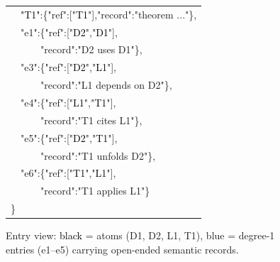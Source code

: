 \begin{figure}[ht]
\begin{minipage}[t]{0.48\textwidth}
{\begin{tabular}{@{}l@{}}
\ \ \textcolor{black}{"T1"}:\{"ref":["\textcolor{black}{T1}"],"record":"theorem ..."\},\\
\ \ \textcolor{blue!70!black}{"e1"}:\{"ref":["\textcolor{black}{D2}","\textcolor{black}{D1}"],\\
\ \ \ \ \ \ "record":"D2 uses D1"\},\\
\ \ \textcolor{blue!70!black}{"e3"}:\{"ref":["\textcolor{black}{D2}","\textcolor{black}{L1}"],\\
\ \ \ \ \ \ "record":"L1 depends on D2"\},\\
\ \ \textcolor{blue!70!black}{"e4"}:\{"ref":["\textcolor{black}{L1}","\textcolor{black}{T1}"],\\
\ \ \ \ \ \ "record":"T1 cites L1"\},\\
\ \ \textcolor{blue!70!black}{"e5"}:\{"ref":["\textcolor{black}{D2}","\textcolor{black}{T1}"],\\
\ \ \ \ \ \ "record":"T1 unfolds D2"\},\\
\ \ \textcolor{blue!70!black}{"e6"}:\{"ref":["\textcolor{black}{T1}","\textcolor{black}{L1}"],\\
\ \ \ \ \ \ "record":"T1 applies L1"\}\\
\}
\end{tabular}
}
\end{minipage}
\caption{Entry view: \textcolor{black}{black} = atoms (D1, D2, L1, T1), \textcolor{blue!70!black}{blue} = degree-1 entries (e1--e5) carrying open-ended semantic records.}
\label{fig:entry-view}
\end{figure}

